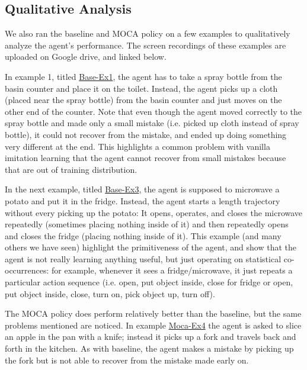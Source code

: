 \documentclass[11pt,a4paper]{article}
\begin{document}
\subsection{Qualitative Analysis}
We also ran the baseline and MOCA policy on a few examples to qualitatively analyze the agent's performance. The screen recordings of these examples are uploaded on Google drive, and linked below.

In example 1, titled \href{https://drive.google.com/file/d/1xXIIFGBwzP2QGCXlV4v_YlFTHf9C8228/view?usp=sharing}{Base-Ex1}, the agent has to take a spray bottle from the basin counter and place it on the toilet. Instead, the agent picks up a cloth (placed near the spray bottle) from the basin counter and just moves on the other end of the counter. Note that even though the agent moved correctly to the spray bottle and made only a small mistake (i.e. picked up cloth instead of spray bottle), it could not recover from the mistake, and ended up doing something very different at the end. This highlights a common problem with vanilla imitation learning that the agent cannot recover from small mistakes because that are out of training distribution.


In the next example, titled \href{https://drive.google.com/file/d/1A790sCe33eKV-MivCO2t5O2DD8Atlh2C/view?usp=sharing}{Base-Ex3}, the agent is supposed to microwave a potato and put it in the fridge. Instead, the agent starts a length trajectory without every picking up the potato: It opens, operates, and closes the microwave repeatedly (sometimes placing nothing inside of it) and then repeatedly opens and closes the fridge (placing nothing inside of it). This example (and many others we have seen) highlight the primitiveness of the agent, and show that the agent is not really learning anything useful, but just operating on statistical co-occurrences: for example, whenever it sees a fridge/microwave, it just repeats a particular action sequence (i.e. open, put object inside, close for fridge or open, put object inside, close, turn on, pick object up, turn off).

The MOCA policy does perform relatively better than the baseline, but the same problems mentioned are noticed. In example \href{https://drive.google.com/file/d/16_FJ3689Mv5dxvu9pU1HZ96QvNm7fCc2/view?usp=sharing}{Moca-Ex4} the agent is asked to slice an apple in the pan with a knife; instead it picks up a fork and travels back and forth in the kitchen. As with baseline, the agent makes a mistake by picking up the fork but is not able to recover from the mistake made early on.
\end{document}
